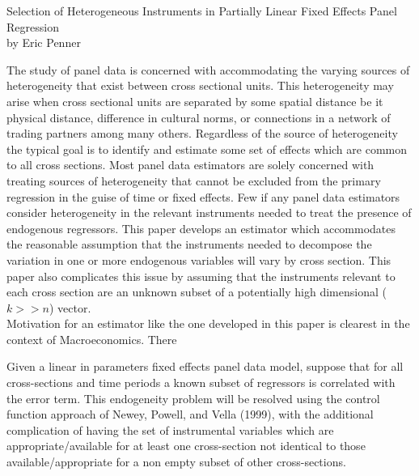 \documentclass[10pt]{article}
\begin{document}
\begin{center}
\Large Selection of Heterogeneous Instruments in Partially Linear
Fixed Effects Panel Regression \\ 
\vspace{0.25cm}
\large by Eric Penner \rm
\end{center}
\doublespacing

\noindent The study of panel data is concerned with accommodating the varying sources of heterogeneity that exist between cross sectional units. This heterogeneity may arise when cross sectional units are separated by some spatial distance be it physical distance, difference in cultural norms, or connections in a network of trading partners among many others. Regardless of the source of heterogeneity the typical goal is to identify and estimate some set of effects which are common to all cross sections. Most panel data estimators are solely concerned with treating sources of heterogeneity that cannot be excluded from the primary regression in the guise of time or fixed effects. Few if any panel data estimators consider heterogeneity in the relevant instruments needed to treat the presence of endogenous regressors. This paper develops an estimator which accommodates the reasonable assumption that the instruments needed to decompose the variation in one or more endogenous variables will vary by cross section. This paper also complicates this issue by assuming that the instruments relevant to each cross section are an unknown subset of a potentially high dimensional ($k>>n$) vector.  \\ 

\noindent Motivation for an estimator like the one developed in this paper is clearest in the context of Macroeconomics. There 


\noindent Given a linear in parameters fixed effects panel data model, suppose that for all cross-sections and time periods a known subset of regressors is correlated with the error term. This endogeneity problem will be resolved using the control function approach of Newey, Powell, and Vella (1999), with the additional complication of having the set of instrumental variables which are appropriate/available for at least one cross-section  not identical to those available/appropriate for a non empty subset of other cross-sections. 
\end{document}
